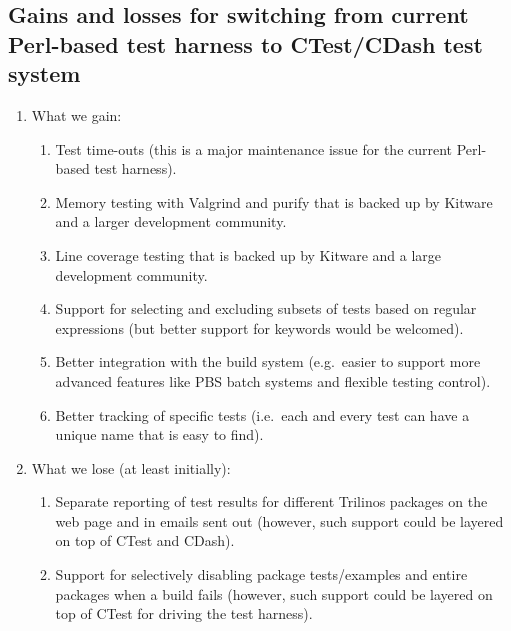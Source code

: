 \documentclass[pdf,ps2pdf,11pt]{SANDreport}
\begin{document}
%
\subsection{Gains and losses for switching from current Perl-based test
harness to CTest/CDash test system}
%

\begin{enumerate}

{}\item What we gain:

  \begin{enumerate}

  {}\item Test time-outs (this is a major maintenance issue for the
  current Perl-based test harness).

  {}\item Memory testing with Valgrind and purify that is backed up by
  Kitware and a larger development community.

  {}\item Line coverage testing that is backed up by Kitware and a
  large development community.

  {}\item Support for selecting and excluding subsets of tests based
  on regular expressions (but better support for keywords would be
  welcomed).

  {}\item Better integration with the build system (e.g.\ easier to
  support more advanced features like PBS batch systems and flexible
  testing control).

  {}\item Better tracking of specific tests (i.e.\ each and every test
  can have a unique name that is easy to find).

  \end{enumerate}

{}\item What we lose (at least initially):

  \begin{enumerate}

  {}\item Separate reporting of test results for different Trilinos
  packages on the web page and in emails sent out (however, such
  support could be layered on top of CTest and CDash).

  {}\item Support for selectively disabling package tests/examples and
  entire packages when a build fails (however, such support could be
  layered on top of CTest for driving the test harness).

  \end{enumerate}

\end{enumerate}
\end{document}

